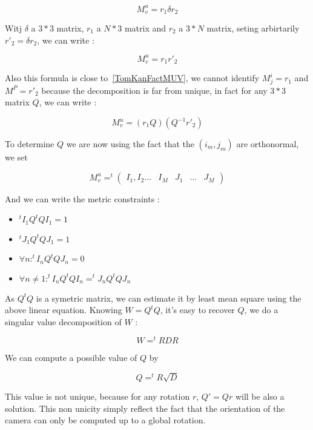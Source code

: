 \begin{equation}
   M^u_v=   r_1  \delta r_2
\end{equation}

Witj $\delta$ a $3*3$ matrix, $r_1$ a $N*3$ matrix and $r_2$ a $3*N$ matrix, seting arbirtarily 
$r'_2 =  \delta r_2$, we can write  :

\begin{equation}
   M^u_v=   r_1   r'_2
\end{equation}


Also this formula is close to~\ref{TomKanFactMUV}, we cannot identify $M^i_j=r_1$ and $ M^P=r'_2$
because the decomposition is far from unique, in fact for any $3*3$ matrix $Q$, we can write :

\begin{equation}
   M^u_v=   (r_1 Q) ( Q^{-1}  r'_2)
\end{equation}

To determine $Q$ we are now using the fact that  the $(i_m,j_m)$ are orthonormal, we set 


\begin{equation}
   M^u_v=   ^t \left( \begin{array}{ccccccc} I_1, I_2 \dots & I_M & J_1 & \dots & J_M 
        \end{array} 
\right)
\end{equation}


And we can write the metric constraints :

\begin{itemize}
   \item  $  ^t I_1 Q ^t Q I_1 = 1 $
   \item  $  ^t J_1 Q ^t Q J_1 = 1 $
   \item  $\forall n :  ^t I_n Q ^t Q J_n = 0 $
   \item  $\forall n \neq 1 :  ^t I_n Q ^t Q I_n =  ^t J_n Q ^t Q J_n   $
\end{itemize}

As $Q ^t Q$ is a symetric matrix, we can estimate it  by least mean square using the
above linear equation. Knowing $W= Q ^t Q$, it's easy to recover $Q$, we do a singular
value decomposition of $W$ :

\begin{equation}
    W =  ^t R D R
\end{equation}

We can compute a possible value of $Q$ by

\begin{equation}
    Q  =  ^t R  \sqrt{D}
\end{equation}


This value is not unique, because for any rotation $r$, $Q' = Qr$ will be also a solution. This
non unicity simply reflect the fact that the orientation of the camera can only be computed
up to a global rotation.




